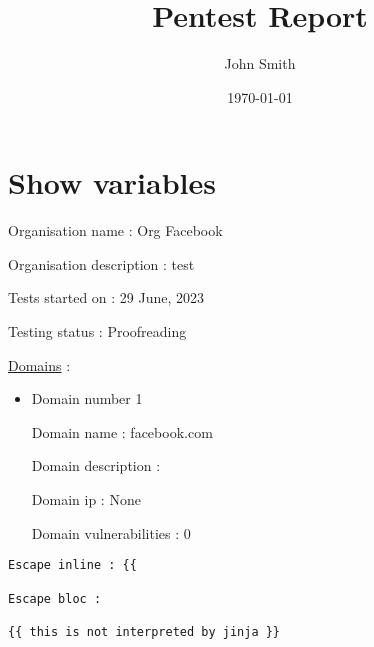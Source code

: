 \documentclass[a4paper,11pt]{book}
\title{Pentest Report} %
\author{John Smith} %
\date{\today} %
\begin{document}
 
\maketitle %

\section{Show variables}

Organisation name : Org Facebook

Organisation description : test

Tests started on : 29 June, 2023\

Testing status : Proofreading

\underline{Domains} :

\begin{itemize}
    \item Domain number 1

    Domain name : facebook.com

    Domain description : 
    
        Domain ip : None

    Domain vulnerabilities : 0
    


    


\end{itemize}


\begin{verbatim} 
Escape inline : {{

Escape bloc : 
 
{{ this is not interpreted by jinja }}

\end{verbatim}
\end{document}
